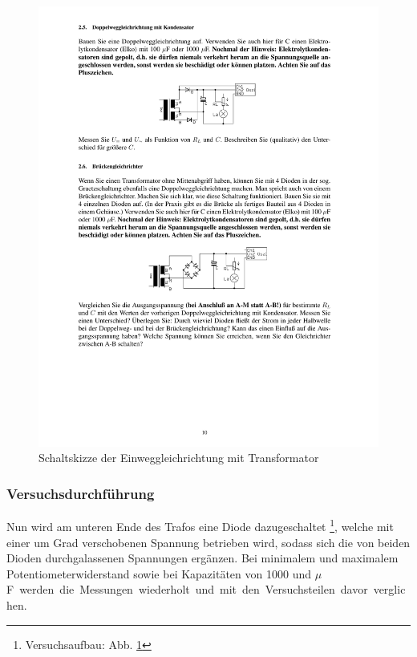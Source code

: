 \documentclass[12pt,a4paper]{article}
\begin{document}
\begin{figure}[H] 
  \centering
    \includegraphics[trim = 10mm 200mm 10mm 45mm, clip, scale = 1]{ep2_14[Page10].pdf}
  	\caption[Schaltskizze der Einweggleichrichtung mit Transformator]{Schaltskizze der Einweggleichrichtung mit Transformator\footnotemark}
  \label{fig:2_6}
\end{figure}

\subsubsection{Versuchsdurchführung}
Nun wird am unteren Ende des Trafos eine Diode dazugeschaltet \footnote{Versuchsaufbau: Abb. \ref{fig:2_6}}, welche mit einer um \unit[180]{Grad} verschobenen Spannung betrieben wird, sodass sich die von beiden Dioden durchgalassenen Spannungen ergänzen. Bei minimalem und maximalem Potentiometerwiderstand sowie bei Kapazitäten von 1000 und \unit[100]{$\mu$F} werden die Messungen wiederholt und mit den Versuchsteilen davor verglichen.
\end{document}
